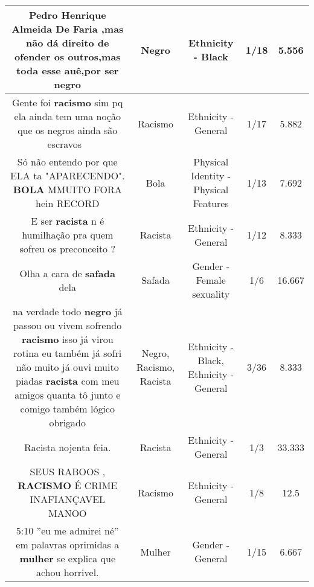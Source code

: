 \documentclass[11pt]{article}
\newlength\mylength
\begin{document}
\begin{center}
\begin{longtable}{|C{.65\mylength}|C{.30\mylength}|C{.12\mylength}|C{.12\mylength}|C{.12\mylength}|}
  \small Pedro Henrique Almeida De Faria ,mas não dá direito de ofender os outros,mas toda esse auê,por ser negro\normalsize   & Negro & Ethnicity - Black & 1/18 & 5.556 \\  \hline
  \small Gente foi \textbf{racismo} sim pq ela  ainda tem uma noção que os negros ainda são escravos 🤦\normalsize   & Racismo & Ethnicity - General & 1/17 & 5.882 \\  \hline
  \small Só não entendo por que ELA ta "APARECENDO". \textbf{BOLA} MMUITO FORA hein RECORD\normalsize   & Bola & Physical Identity - Physical Features & 1/13 & 7.692 \\  \hline
  \small E ser \textbf{racista} n é humilhação pra quem sofreu os preconceito ?\normalsize   & Racista & Ethnicity - General & 1/12 & 8.333 \\  \hline
  \small Olha a cara de \textbf{safada} dela\normalsize   & Safada & Gender - Female sexuality & 1/6 & 16.667 \\  \hline
  \small na verdade todo \textbf{negro}  já passou ou vivem sofrendo \textbf{racismo} isso já virou rotina eu também já sofri não muito já ouvi muito piadas \textbf{racista} com meu amigos quanta tô junto e comigo também lógico obrigado\normalsize   & Negro, Racismo, Racista & Ethnicity - Black, Ethnicity - General & 3/36 & 8.333 \\  \hline
  \small Racista nojenta feia.\normalsize   & Racista & Ethnicity - General & 1/3 & 33.333 \\  \hline
  \small SEUS RABOOS , \textbf{RACISMO} É CRIME INAFIANÇAVEL MANOO\normalsize   & Racismo & Ethnicity - General & 1/8 & 12.5 \\  \hline
  \small 5:10 ''eu me admirei né''  em palavras oprimidas a \textbf{mulher} se explica que achou horrivel.\normalsize   & Mulher & Gender - General & 1/15 & 6.667 \\  \hline

\end{longtable}
\end{center}
\end{document}
